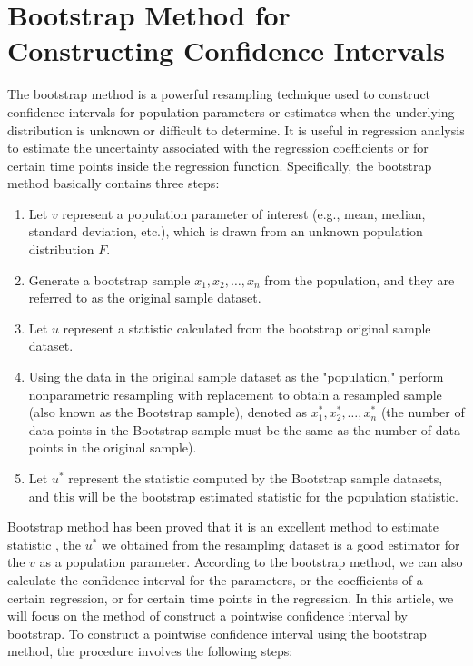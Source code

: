 \documentclass[12pt]{article}
\begin{document}
\section{Bootstrap Method for Constructing Confidence Intervals}
\label{Bootstrap Method for Constructing Confidence Intervals}

The bootstrap method is a powerful resampling technique used to construct confidence intervals for population parameters or estimates when the underlying distribution is unknown or difficult to determine. \cite{hall2013simple}It is useful in regression analysis to estimate the uncertainty associated with the regression coefficients or for certain time points inside the regression function. Specifically, the bootstrap method basically contains three steps:

\begin{enumerate}[label=\arabic*.]
    \item Let \(v\) represent a population parameter of interest (e.g., mean, median, standard deviation, etc.), which is drawn from an unknown population distribution \(F\).
    \item Generate a bootstrap sample \(x_1, x_2, \ldots, x_n\) from the population, and they are referred to as the original sample dataset.
    \item Let \(u\) represent a statistic calculated from the bootstrap original sample dataset.
    \item Using the data in the original sample dataset as the "population," perform nonparametric resampling with replacement to obtain a resampled sample (also known as the Bootstrap sample), denoted as \(x_1^*, x_2^*, \ldots, x_n^*\) (the number of data points in the Bootstrap sample must be the same as the number of data points in the original sample).
    \item Let \(u^*\) represent the statistic computed by the Bootstrap sample datasets, and this will be the bootstrap estimated statistic for the population statistic.

\end{enumerate}

Bootstrap method has been proved that it is an excellent method to estimate statistic \cite{efron1979bootstrap}, the \(u^*\) we obtained from the resampling dataset is a good estimator for the \(v\) as a population parameter. According to the bootstrap method, we can also calculate the confidence interval for the parameters, or the coefficients of a certain regression, or for certain time points in the regression. In this article, we will focus on the method of construct a pointwise confidence interval by bootstrap. To construct a pointwise confidence interval using the bootstrap method, the procedure involves the following steps:
\end{document}
